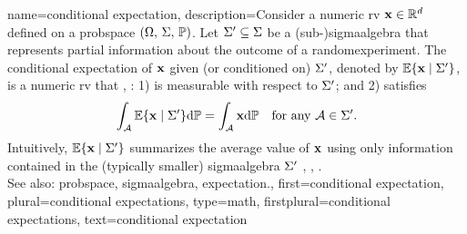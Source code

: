 {name={conditional expectation}, 
	description={Consider a numeric \gls{rv} ${\bf x} \in \mathbb{R}^{d}$ defined on a 
                 \gls{probspace} $(\Omega,\,\Sigma,\,\mathbb{P})$. 
                 Let $\Sigma' \subseteq \Sigma$ be a (sub-)\gls{sigmaalgebra} that 
                 represents partial information about the \gls{outcome} of a \gls{randomexperiment}. 
                 The conditional \gls{expectation} of 
                 ${\bf x}$ given (or conditioned on) $\Sigma'$, denoted by
                 $\mathbb{E}\{ {\bf x} \mid \Sigma'\}$, is a numeric \gls{rv} 
		that \cite[Sec. 34]{BillingsleyProbMeasure}, \cite{durrett2010probability}:
                	1) is \gls{measurable} with respect to $\Sigma'$; and
                 2) satisfies
		$$
    		\int_{\mathcal{A}} \mathbb{E}\{{\bf x} \mid \Sigma'\} {\rm d} \mathbb{P} =
    		\int_{\mathcal{A}} {\bf x} {\rm d} \mathbb{P} \quad \text{for any } \mathcal{A} \in \Sigma'.
		$$
               	Intuitively, $\mathbb{E}\{{\bf x} \mid \Sigma'\}$ summarizes 
               	the average value of ${\bf x}$ using only information contained 
               	in the (typically smaller) \gls{sigmaalgebra} $\Sigma'$ 
		\cite{BillingsleyProbMeasure}, \cite{GrayProbBook}, \cite{ross2013first}. 
		\\
              	See also: \gls{probspace}, \gls{sigmaalgebra}, \gls{expectation}.}, 
 	first={conditional expectation},
 	plural={conditional expectations}, 
 	type=math, 
 	firstplural={conditional expectations},  
 	text={conditional expectation}
}

